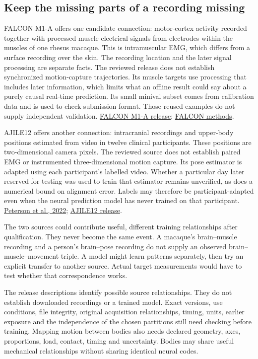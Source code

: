 \subsection{Keep the missing parts of a recording missing}

FALCON M1-A offers one candidate connection: motor-cortex activity recorded together with processed muscle electrical signals from electrodes within the muscles of one rhesus macaque. This is intramuscular EMG, which differs from a surface recording over the skin. The recording location and the later signal processing are separate facts. The reviewed release does not establish synchronized motion-capture trajectories. Its muscle targets use processing that includes later information, which limits what an offline result could say about a purely causal real-time prediction. Its small minival subset comes from calibration data and is used to check submission format. Those reused examples do not supply independent validation. \href{https://doi.org/10.48324/dandi.000941/0.241029.1405}{FALCON M1-A release}; \href{https://papers.nips.cc/paper_files/paper/2024/file/8c2e6bb15be1894b8fb4e0f9bcad1739-Paper-Datasets_and_Benchmarks_Track.pdf}{FALCON methods}.

AJILE12 offers another connection: intracranial recordings and upper-body positions estimated from video in twelve clinical participants. These positions are two-dimensional camera pixels. The reviewed source does not establish paired EMG or instrumented three-dimensional motion capture. Its pose estimator is adapted using each participant's labelled video. Whether a particular day later reserved for testing was used to train that estimator remains unverified, as does a numerical bound on alignment error. Labels may therefore be participant-adapted even when the neural prediction model has never trained on that participant. \href{https://doi.org/10.1038/s41597-022-01280-y}{Peterson et al., 2022}; \href{https://doi.org/10.48324/dandi.000055/0.220127.0436}{AJILE12 release}.

The two sources could contribute useful, different training relationships after qualification. They never become the same event. A macaque's brain--muscle recording and a person's brain--pose recording do not supply an observed brain--muscle--movement triple. A model might learn patterns separately, then try an explicit transfer to another source. Actual target measurements would have to test whether that correspondence works.

The release descriptions identify possible source relationships. They do not establish downloaded recordings or a trained model. Exact versions, use conditions, file integrity, original acquisition relationships, timing, units, earlier exposure and the independence of the chosen partitions still need checking before training. Mapping motion between bodies also needs declared geometry, axes, proportions, load, contact, timing and uncertainty. Bodies may share useful mechanical relationships without sharing identical neural codes.

